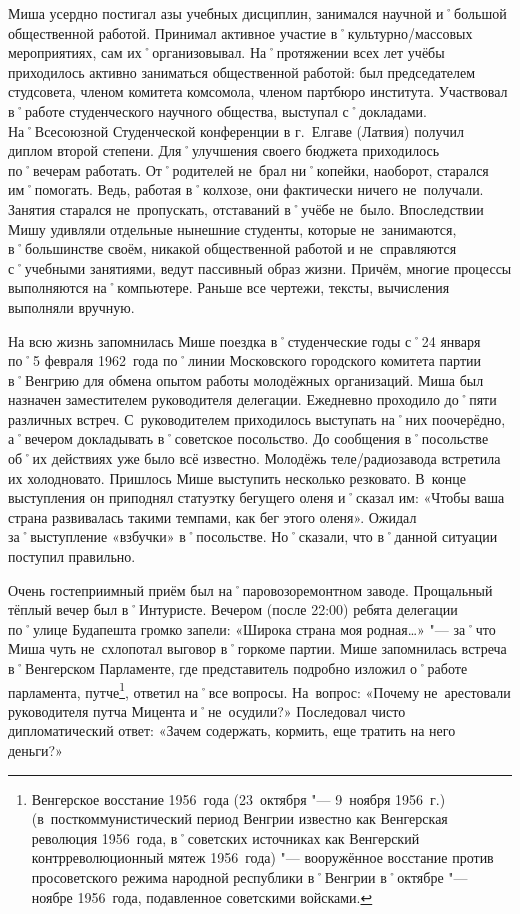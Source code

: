 Миша усердно постигал азы учебных дисциплин, занимался научной и˚большой общественной работой. Принимал активное участие в˚культурно\-/массовых мероприятиях, сам их˚организовывал. На˚протяжении всех лет учёбы приходилось активно заниматься общественной работой: был председателем студсовета, членом комитета комсомола, членом партбюро института. Участвовал в˚работе студенческого научного общества, выступал с˚докладами. На˚Всесоюзной Студенческой конференции в г.~Елгаве (Латвия) получил диплом второй степени. Для˚улучшения своего бюджета приходилось по˚вечерам работать. От˚родителей не~брал ни˚копейки, наоборот, старался им˚помогать. Ведь, работая в˚колхозе, они фактически ничего не~получали. Занятия старался не~пропускать, отставаний в˚учёбе не~было. Впоследствии Мишу удивляли отдельные нынешние студенты, которые не~занимаются, в˚большинстве своём, никакой общественной работой и не~справляются с˚учебными занятиями, ведут пассивный образ жизни. Причём, многие процессы выполняются на˚компьютере. Раньше все чертежи, тексты, вычисления выполняли вручную.

На всю жизнь запомнилась Мише поездка в˚студенческие годы с˚24 января по˚5 февраля 1962~года по˚линии Московского городского комитета партии в˚Венгрию для обмена опытом работы молодёжных организаций. Миша был назначен заместителем руководителя делегации. Ежедневно проходило до˚пяти различных встреч. С~руководителем приходилось выступать на˚них поочерёдно, а˚вечером докладывать в˚советское посольство. До сообщения в˚посольстве об˚их действиях уже было всё известно. Молодёжь теле\-/радиозавода встретила их холодновато. Пришлось Мише выступить несколько резковато. В~конце выступления он приподнял статуэтку бегущего оленя и˚сказал им: «Чтобы ваша страна развивалась такими темпами, как бег этого оленя». Ожидал за˚выступление «взбучки» в˚посольстве. Но˚сказали, что в˚данной ситуации поступил правильно. 

Очень гостеприимный приём был на˚паровозоремонтном заводе. Прощальный тёплый вечер был в˚Интуристе. Вечером (после 22:00) ребята делегации по˚улице Будапешта громко запели: «Широка страна моя родная…» "--- за˚что Миша чуть не~схлопотал выговор в˚горкоме партии. Мише запомнилась встреча в˚Венгерском Парламенте, где представитель подробно изложил о˚работе парламента, путче\footnote{Венгерское восстание 1956~года (23~октября "--- 9~ноября 1956~г.) (в~посткоммунистический период Венгрии известно как Венгерская революция 1956~года, в˚советских источниках как Венгерский контрреволюционный мятеж 1956~года) "--- вооружённое восстание против просоветского режима народной республики в˚Венгрии в˚октябре "--- ноябре 1956~года, подавленное советскими войсками.}, ответил на˚все вопросы. На~вопрос: «Почему не~арестовали руководителя путча Мицента и˚не~осудили?» Последовал чисто дипломатический ответ: «Зачем содержать, кормить, еще тратить на него деньги?»

